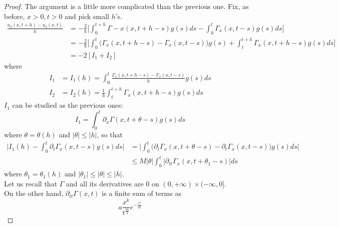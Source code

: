 \begin{itemize}
    \begin{ProofBox}
        \begin{proof}
            The argument is a little more complicated than the previous one. Fix, as before, $x > 0, t > 0$ and pick small $h$'s. 
            \begin{align*}
                \frac{u_2(x,t+h)-u_2(x,t)}{h} &= -\frac{2}{h} \Bigg[\int_0^{t+h} \Gamma-x(x,t+h-s)g(s) ds - \int_0^t \Gamma_x(x,t-s) g(s) ds \Bigg]\\
                &= -\frac{2}{h} \Bigg[ \int_0^t \Bigg(\Gamma_x(x,t+h-s)-\Gamma_x(x,t-s)\Bigg) g(s) + \int_t^{t+h} \Gamma_x(x,t+h-s) g(s) ds \Bigg]\\
                &= -2 [I_1 + I_2]
            \end{align*}
            where 
            \begin{equation*}
            \begin{split}
                 I_1 &= I_1(h) = \int_0^t \frac{\Gamma_x(x,t+h-s) - \Gamma_x(x,t-s)}{h} g(s) ds \\
                 I_2&= I_2 (h) = \frac{1}{h}\int_t^{t+h} \Gamma_x(x,t+h-s) g(s) ds 
            \end{split}
            \end{equation*}
            $I_1$ can be studied as the previous ones:
            \begin{equation*}
                I_1 = \int_0^t \partial_x \Gamma(x,t+\theta -s) g(s) ds 
            \end{equation*}
            where $\theta = \theta(h)$ and $|\theta| \leq |h|$, so that 
            \begin{align*}
                \Big|I_1(h) - \int_0^t \partial_t \Gamma_x(x,t-s) g(s) ds \Big| &= \Big|\int_0^t \Bigg(\partial_t \Gamma_x (x,t+\theta-s) - \partial_t \Gamma_x(x,t-s)\Bigg) g(s) ds \Big|\\
                &\leq M |\theta| \int_0^t |\partial_{tt} \Gamma_x (x,t+\theta_1 - s)| ds 
            \end{align*}
            where $\theta_1 = \theta_1(h)$ and $|\theta_1| \leq |\theta| \leq |h|$. \\
            Let us recall that $\Gamma$ and all its derivatives are $0$ on $(0,+\infty) \times (-\infty,0]$. \\
            On the other hand, $\partial_{tt} \Gamma(x,t)$ is a finite sum of terms as 
            \begin{equation*}
                a \frac{x^k}{t^\frac{m}{2}}e^{-\frac{x^2}{4t}}
            \end{equation*}

\end{proof}
\end{ProofBox}
\end{itemize}
